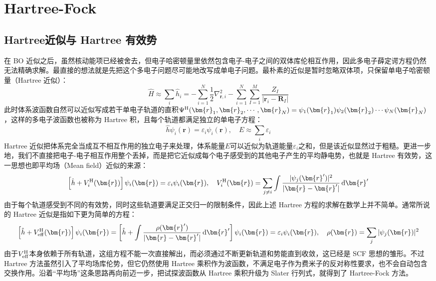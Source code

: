 \section{Hartree-Fock}
\subsection{Hartree近似与 Hartree 有效势}\label{sec:hartree}
在 BO 近似之后，虽然核动能项已经被舍去，但电子哈密顿量里依然包含电子-电子之间的双体库伦相互作用，因此多电子薛定谔方程仍然无法精确求解。最直接的想法就是先把这个多电子问题尽可能地改写成单电子问题。最朴素的近似是暂时忽略双体项，只保留单电子哈密顿量（Hartree 近似）：
\[\hat{H}\approx\sum_i\hat{h}_i=-\sum_{i=1}^N\frac{1}{2}\nabla^2_{\mathbf{r},i}-\sum_{i=1}^{N}\sum_{I=1}^{M}\frac{Z_{I}}{|\mathbf{r}_{i}-\mathbf{R}_{I}|}\]
此时体系波函数自然可以近似写成若干单电子轨道的直积$\Psi^{\rm H}(\bm{r}_1,\bm{r}_2,\cdots,\bm{r}_N)=\psi_1(\bm{r}_1)\psi_2(\bm{r}_2)\cdots\psi_N(\bm{r}_N)$，这样的多电子波函数也被称为 Hartree 积，且每个轨道都满足独立的单电子方程：
\[\hat{h}\psi_i(\bm{r})=\varepsilon_i\psi_i(\bm{r}), \quad E\approx\sum_i\varepsilon_i\]
Hartree 近似把体系完全当成互不相互作用的独立电子来处理，体系能量$E$可以近似为轨道能量$\varepsilon_i$之和，但是该近似显然过于粗糙。更进一步地，我们不直接把电子-电子相互作用整个丢掉，而是把它近似成每个电子感受到的其他电子产生的平均静电势，也就是 Hartree 有效势，这一思想也即平均场（Mean field）近似的来源：
\[\left[\hat{h}+V_i^{\rm H}(\bm{r})\right]\psi_i(\bm{r})=\varepsilon_i\psi_i(\bm{r}), \quad V_i^{\rm H}(\bm{r})=\sum_{j\ne i}\int\frac{|\psi_j(\bm{r}')|^2}{|\bm{r}-\bm{r}'|}\dd{\bm{r}'}\]
由于每个轨道感受到不同的有效势，同时这些轨道要满足正交归一的限制条件，因此上述 Hartree 方程的求解在数学上并不简单。通常所说的 Hartree 近似是指如下更为简单的方程：
\[\left[\hat{h}+V_{\rm eff}^{\rm H}(\bm{r})\right]\psi_i(\bm{r})=\left[\hat{h}+\int\frac{\rho(\bm{r}')}{|\bm{r}-\bm{r}'|}\dd{\bm{r}'}\right]\psi_i(\bm{r})=\varepsilon_i\psi_i(\bm{r}), \quad \rho(\bm{r})=\sum_j|\psi_j(\bm{r})|^2\]
由于$V_{\rm eff}^{\rm H}$本身依赖于所有轨道，这组方程不能一次直接解出，而必须通过不断更新轨道和势能直到收敛，这已经是 SCF 思想的雏形。不过 Hartree 方法虽然引入了平均场库伦势，但它仍然使用 Hartree 乘积作为波函数，不满足电子作为费米子的反对称性要求，也不会自动包含交换作用。沿着“平均场”这条思路再向前迈一步，把试探波函数从 Hartree 乘积升级为 Slater 行列式，就得到了 Hartree-Fock 方法。

